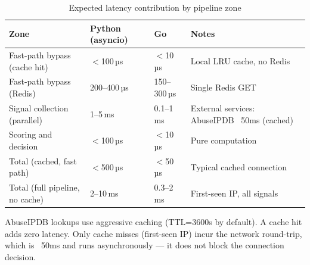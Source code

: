 \begin{fullwidth}
\begin{table}[h]
\caption{Expected latency contribution by pipeline zone}
\label{tab:pipeline-perf}
\begin{tabular}{@{}llll@{}}
\toprule
\textbf{Zone} & \textbf{Python (asyncio)} & \textbf{Go} & \textbf{Notes} \\
\midrule
Fast-path bypass (cache hit) & $<$100\,µs & $<$10\,µs & Local LRU cache, no Redis \\
Fast-path bypass (Redis) & 200–400\,µs & 150–300\,µs & Single Redis GET \\
Signal collection (parallel) & 1–5\,ms & 0.1–1\,ms & External services: AbuseIPDB ~50ms (cached) \\
Scoring and decision & $<$100\,µs & $<$10\,µs & Pure computation \\
Total (cached, fast path) & $<$500\,µs & $<$50\,µs & Typical cached connection \\
Total (full pipeline, no cache) & 2–10\,ms & 0.3–2\,ms & First-seen IP, all signals \\
\bottomrule
\end{tabular}
\end{table}
\end{fullwidth}

\begin{notebox}
AbuseIPDB lookups use aggressive caching (TTL=3600s by default). A cache hit adds zero
latency. Only cache misses (first-seen IP) incur the network round-trip, which is
~50ms and runs asynchronously — it does not block the connection decision.
\end{notebox}
